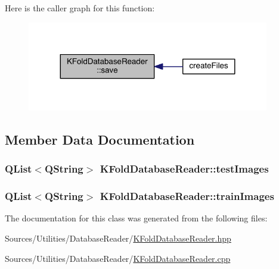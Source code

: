 Here is the caller graph for this function\+:
\nopagebreak
\begin{figure}[H]
\begin{center}
\leavevmode
\includegraphics[width=299pt]{class_k_fold_database_reader_a3f0544d79d13bd58015a2d15df5efaa6_icgraph}
\end{center}
\end{figure}




\subsection{Member Data Documentation}
\hypertarget{class_k_fold_database_reader_a224507fbe965e1fb12089fb572d72681}{
\subsubsection[{test\+Images}]{\setlength{\rightskip}{0pt plus 5cm}Q\+List$<$Q\+String$>$ K\+Fold\+Database\+Reader\+::test\+Images\hspace{0.3cm}{\ttfamily [private]}}}\label{class_k_fold_database_reader_a224507fbe965e1fb12089fb572d72681}
\hypertarget{class_k_fold_database_reader_a93461f0d927f76d6dad7af885e16b172}{
\subsubsection[{train\+Images}]{\setlength{\rightskip}{0pt plus 5cm}Q\+List$<$Q\+String$>$ K\+Fold\+Database\+Reader\+::train\+Images\hspace{0.3cm}{\ttfamily [private]}}}\label{class_k_fold_database_reader_a93461f0d927f76d6dad7af885e16b172}


The documentation for this class was generated from the following files\+:\begin{DoxyCompactItemize}
\item 
Sources/\+Utilities/\+Database\+Reader/\hyperlink{_k_fold_database_reader_8hpp}{K\+Fold\+Database\+Reader.\+hpp}\item 
Sources/\+Utilities/\+Database\+Reader/\hyperlink{_k_fold_database_reader_8cpp}{K\+Fold\+Database\+Reader.\+cpp}\end{DoxyCompactItemize}
